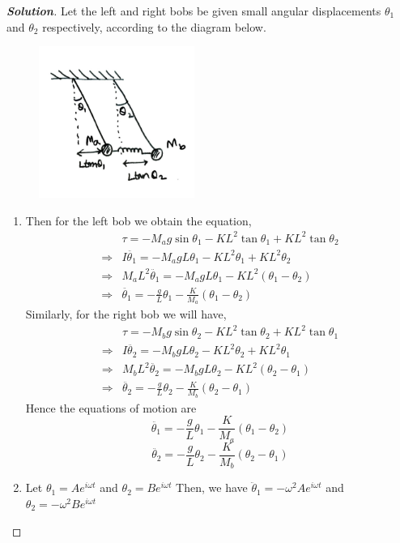 \documentclass[10pt]{scrartcl}
\theoremstyle{definition}
\newenvironment{solution} {\begin{proof}[\normalfont \textbf{Solution}]} {\end{proof}}
\begin{document}
\begin{solution}
    Let the left and right bobs be given small angular displacements $\theta_1$ and $\theta_2$ respectively, according to the diagram below.
    \begin{figure}[h]
        \centering
        \includegraphics[width=2.0in]{pendulum.jpg}
    \end{figure}
    \begin{enumerate}[label={(\alph*)}]
        \item Then for the left bob we obtain the equation, 
            \begin{align*}
                &\tau = -M_a g \sin\theta_1 - KL^2\tan\theta_1 + KL^2\tan\theta_2 \\ 
                \Rightarrow &I\ddot{\theta_1} = -M_a g L\theta_1 - KL^2\theta_1 + KL^2\theta_2 \\ 
                \Rightarrow &M_a L^2\ddot{\theta_1} = -M_a g L\theta_1 - KL^2(\theta_1 - \theta_2) \\ 
                \Rightarrow &\ddot{\theta_1} = -\frac{g}{L}\theta_1 - \frac{K}{M_a}(\theta_1 -\theta_2)
            \end{align*}
            Similarly, for the right bob we will have, 
            \begin{align*}
                &\tau = -M_b g \sin\theta_2 - KL^2\tan\theta_2 + KL^2\tan\theta_1 \\ 
                \Rightarrow &I\ddot{\theta_2} = -M_b g L\theta_2 - KL^2\theta_2 + KL^2\theta_1 \\ 
                \Rightarrow &M_b L^2\ddot{\theta_2} = -M_b g L\theta_2 - KL^2(\theta_2 - \theta_1) \\ 
                \Rightarrow &\ddot{\theta_2} = -\frac{g}{L}\theta_2 - \frac{K}{M_b}(\theta_2 -\theta_1)
            \end{align*}
            Hence the equations of motion are
            $$\boxed{\ddot{\theta_1} = -\frac{g}{L}\theta_1 - \frac{K}{M_a}(\theta_1 -\theta_2)}$$
            $$\boxed{\ddot{\theta_2} = -\frac{g}{L}\theta_2 - \frac{K}{M_b}(\theta_2 -\theta_1)}$$
        \item Let $\theta_1 = Ae^{i\omega t}$ and $\theta_2 = Be^{i\omega t}$
            Then, we have $\ddot\theta_1 = -\omega^2Ae^{i\omega t}$ and $\theta_2 = -\omega^2 Be^{i\omega t}$


\end{enumerate}
\end{solution}
\end{document}
